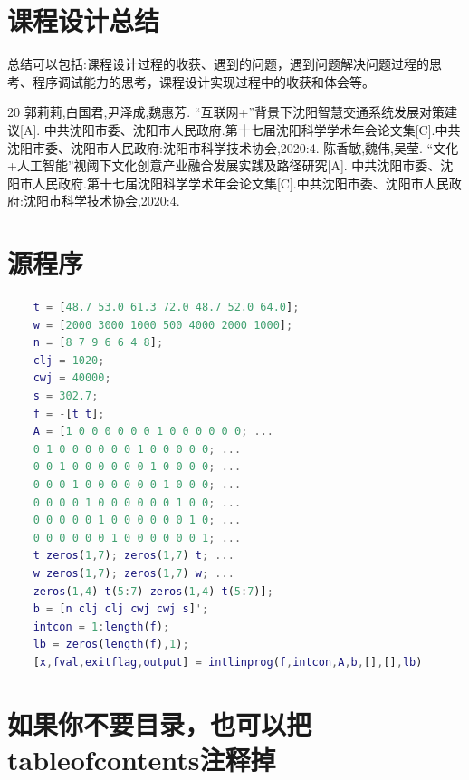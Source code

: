 \documentclass[fontset=fandol]{ctexart}
\begin{document}
\section{课程设计总结}

总结可以包括:课程设计过程的收获、遇到的问题，遇到问题解决问题过程的思考、程序调试能力的思考，课程设计实现过程中的收获和体会等。

\begin{thebibliography}{20}
	郭莉莉,白国君,尹泽成,魏惠芳. “互联网+”背景下沈阳智慧交通系统发展对策建议[A]. 中共沈阳市委、沈阳市人民政府.第十七届沈阳科学学术年会论文集[C].中共沈阳市委、沈阳市人民政府:沈阳市科学技术协会,2020:4.
	陈香敏,魏伟,吴莹. “文化+人工智能”视阈下文化创意产业融合发展实践及路径研究[A]. 中共沈阳市委、沈阳市人民政府.第十七届沈阳科学学术年会论文集[C].中共沈阳市委、沈阳市人民政府:沈阳市科学技术协会,2020:4.
\end{thebibliography}

\section{源程序}

\begin{lstlisting}[language=matlab,caption={求解问题1的MatLab代码}]
	% 代码！也可以写在这里！
	t = [48.7 53.0 61.3 72.0 48.7 52.0 64.0];
	w = [2000 3000 1000 500 4000 2000 1000];
	n = [8 7 9 6 6 4 8];
	clj = 1020;
	cwj = 40000;
	s = 302.7;
	f = -[t t];
	A = [1 0 0 0 0 0 0 1 0 0 0 0 0 0; ...
	0 1 0 0 0 0 0 0 1 0 0 0 0 0; ...
	0 0 1 0 0 0 0 0 0 1 0 0 0 0; ...
	0 0 0 1 0 0 0 0 0 0 1 0 0 0; ...
	0 0 0 0 1 0 0 0 0 0 0 1 0 0; ...
	0 0 0 0 0 1 0 0 0 0 0 0 1 0; ...
	0 0 0 0 0 0 1 0 0 0 0 0 0 1; ...
	t zeros(1,7); zeros(1,7) t; ...
	w zeros(1,7); zeros(1,7) w; ...
	zeros(1,4) t(5:7) zeros(1,4) t(5:7)];
	b = [n clj clj cwj cwj s]';
	intcon = 1:length(f);
	lb = zeros(length(f),1);
	[x,fval,exitflag,output] = intlinprog(f,intcon,A,b,[],[],lb)
\end{lstlisting}

\section{如果你不要目录，也可以把tableofcontents注释掉}
\end{document}
